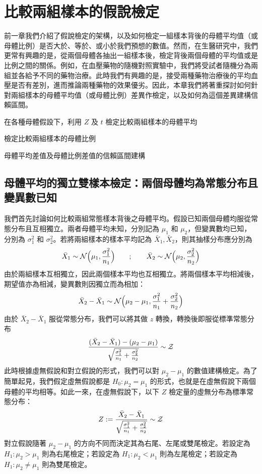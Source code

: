 \chapter{比較兩組樣本的假說檢定}

    前一章我們介紹了假說檢定的架構，以及如何檢定一組樣本背後的母體平均值（或母體比例）是否大於、等於、或小於我們預想的數值。然而，在生醫研究中，我們更常有興趣的是，從兩個母體各抽出一組樣本後，檢定背後兩個母體的平均值或是比例之間的關係。例如，在血壓藥物的隨機對照實驗中，我們將受試者隨機分為兩組並各給予不同的藥物治療。此時我們有興趣的是，接受兩種藥物治療後的平均血壓是否有差別，進而推論兩種藥物的效果優劣。因此，本章我們將著重探討如何針對兩組樣本的母體平均值（或母體比例）差異作檢定，以及如何為這個差異建構信賴區間。
    
    \begin{introduction}
        \item 在各種母體假設下，利用 $Z$ 及 $t$ 檢定比較兩組樣本的母體平均
        \item 檢定比較兩組樣本的母體比例
        \item 母體平均差值及母體比例差值的信賴區間建構
    \end{introduction}

\section{母體平均的獨立雙樣本檢定：兩個母體均為常態分布且變異數已知}

    我們首先討論如何比較兩組常態樣本背後之母體平均。假設已知兩個母體均服從常態分布且互相獨立。兩者母體平均未知，分別記為 $\mu_1$ 和 $\mu_2$，但變異數均已知，分別為 $\sigma_1^2$ 和 $\sigma_2^2$。若將兩組樣本的樣本平均記為 $\bar{X}_1, \bar{X}_2$，則其抽樣分布應分別為
    \[\bar{X}_1 \sim \mathcal{N}\Big(\mu_1, \frac{\sigma_1^2}{n_1}\Big) \qquad ; \qquad \bar{X}_2 \sim \mathcal{N}\Big(\mu_2, \frac{\sigma_2^2}{n_2}\Big)\]
    由於兩組樣本互相獨立，因此兩個樣本平均也互相獨立。將兩個樣本平均相減後，期望值亦為相減，變異數則因獨立而為相加：
    \[\bar{X}_2-\bar{X}_1 \sim \mathcal{N} \Big(\mu_2 - \mu_1, \frac{\sigma_1^2}{n_1} + \frac{\sigma_2^2}{n_2}\Big)\]
    由於 $\bar{X}_2-\bar{X}_1$ 服從常態分布，我們可以將其做 $z$ 轉換，轉換後即服從標準常態分布
    \[\frac{(\bar{X}_2-\bar{X}_1)-(\mu_2-\mu_1)}{\sqrt{\frac{\sigma_1^2}{n_1} + \frac{\sigma_2^2}{n_2}}} \sim \mathcal{Z}\]
    此時根據虛無假說和對立假說的形式，我們可以對 $\mu_2-\mu_1$ 的數值建構檢定。為了簡單起見，我們假定虛無假說都是 $H_0: \mu_2 = \mu_1$ 的形式，也就是在虛無假說下兩個母體的平均相等。如此一來，在虛無假說下，以下 $Z$ 檢定量的虛無分布為標準常態分布：
    \[Z := \frac{\bar{X}_2-\bar{X}_1}{\sqrt{\frac{\sigma_1^2}{n_1} + \frac{\sigma_2^2}{n_2}}} \sim \mathcal{Z}\]
    對立假說隨著 $\mu_2-\mu_1$ 的方向不同而決定其為右尾、左尾或雙尾檢定。若設定為 $H_1: \mu_2 > \mu_1$ 則為右尾檢定；若設定為 $H_1: \mu_2 < \mu_1$ 則為左尾檢定；若設定為 $H_1: \mu_2 \ne \mu_1$ 則為雙尾檢定。

